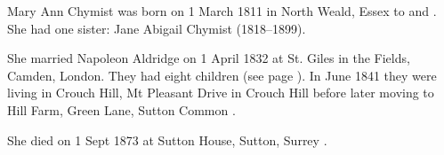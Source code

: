 
Mary Ann Chymist was born on 1 March 1811 in North Weald, Essex to  and \cite{MaryAnnCBirth}.
She had one sister: Jane Abigail Chymist (1818--1899).

She married Napoleon Aldridge on 1 April 1832 at St. Giles in the Fields, Camden, London.  They had eight children (see page \pageref{Napoleon_Aldridge}).
In June 1841 they were living in Crouch Hill, Mt Pleasant Drive in Crouch Hill \cite{MaryAnnCResidence} before later moving to Hill Farm, Green Lane, Sutton Common \cite{MaryAnnCFarm}.

She died on 1 Sept 1873 at Sutton House, Sutton, Surrey \cite{MaryAnnCDeath}.
